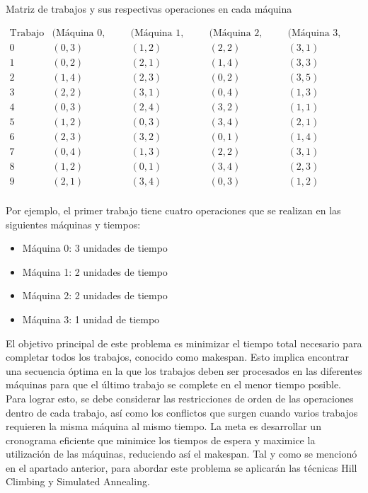 \documentclass[11pt]{article}
\begin{document}
\begin{table}[H]
\centering
\caption{Matriz de trabajos y sus respectivas operaciones en cada máquina}
\[
\begin{array}{c|cccc}
\text{Trabajo} & \text{(Máquina 0, Tiempo)} & \text{(Máquina 1, Tiempo)} & \text{(Máquina 2, Tiempo)} & \text{(Máquina 3, Tiempo)} \\
\hline
0 & (0, 3) & (1, 2) & (2, 2) & (3, 1) \\
1 & (0, 2) & (2, 1) & (1, 4) & (3, 3) \\
2 & (1, 4) & (2, 3) & (0, 2) & (3, 5) \\
3 & (2, 2) & (3, 1) & (0, 4) & (1, 3) \\
4 & (0, 3) & (2, 4) & (3, 2) & (1, 1) \\
5 & (1, 2) & (0, 3) & (3, 4) & (2, 1) \\
6 & (2, 3) & (3, 2) & (0, 1) & (1, 4) \\
7 & (0, 4) & (1, 3) & (2, 2) & (3, 1) \\
8 & (1, 2) & (0, 1) & (3, 4) & (2, 3) \\
9 & (2, 1) & (3, 4) & (0, 3) & (1, 2) \\
\end{array}
\]
\label{tabla:matriz-trabajos}
\end{table}

Por ejemplo, el primer trabajo tiene cuatro operaciones que se realizan en las siguientes máquinas y tiempos:

\begin{multicols}{2}

\begin{itemize}
 \item Máquina 0: 3 unidades de tiempo
 \item Máquina 1: 2 unidades de tiempo
 \item Máquina 2: 2 unidades de tiempo
 \item Máquina 3: 1 unidad de tiempo
 \end{itemize}

\end{multicols} 

\noindent  El objetivo principal de este problema es minimizar el tiempo total necesario para completar todos los trabajos, conocido como makespan. Esto implica encontrar una secuencia óptima en la que los trabajos deben ser procesados en las diferentes máquinas para que el último trabajo se complete en el menor tiempo posible. Para lograr esto, se debe considerar las restricciones de orden de las operaciones dentro de cada trabajo, así como los conflictos que surgen cuando varios trabajos requieren la misma máquina al mismo tiempo. La meta es desarrollar un cronograma eficiente que minimice los tiempos de espera y maximice la utilización de las máquinas, reduciendo así el makespan. Tal y como se mencionó en el apartado anterior, para abordar este problema se aplicarán las técnicas Hill Climbing y Simulated Annealing. 
\end{document}
